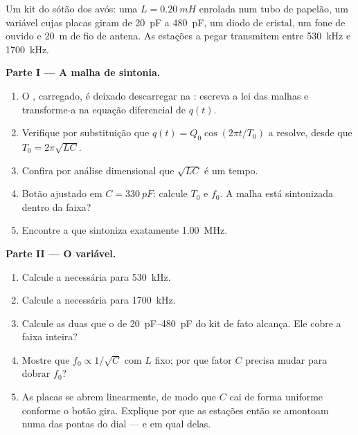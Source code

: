 \begin{problem}
\label{pb:g12:rlc-oscillations:1}
Um kit do sótão dos avós: uma  $L = \qty{0.20}{mH}$ enrolada num tubo de papelão,
um  variável cujas placas giram de \qty{20}{pF} a \qty{480}{pF}, um diodo de
cristal, um fone de ouvido e \qty{20}{m} de fio de antena. As estações a pegar
transmitem entre \qty{530}{kHz} e \qty{1700}{kHz}.

\medskip
\noindent\textbf{Parte I --- A malha de sintonia.}
\begin{enumerate}
  \item O , carregado, é deixado descarregar na : escreva a lei das
        malhas e transforme-a na equação diferencial de $q(t)$.
  \item Verifique por substituição que $q(t) = Q_0\cos(2\pi t/T_0)$ a resolve, desde
        que $T_0 = 2\pi\sqrt{LC}$.
  \item Confira por análise dimensional que $\sqrt{LC}$ é um tempo.
  \item Botão ajustado em $C = \qty{330}{pF}$: calcule $T_0$ e $f_0$. A malha está
        sintonizada dentro da faixa?
  \item Encontre a  que sintoniza exatamente \qty{1.00}{MHz}.
\end{enumerate}

\medskip
\noindent\textbf{Parte II --- O  variável.}
\begin{enumerate}[resume]
  \item Calcule a  necessária para \qty{530}{kHz}.
  \item Calcule a  necessária para \qty{1700}{kHz}.
  \item Calcule as duas  que o  de \qtyrange{20}{480}{pF} do kit
        de fato alcança. Ele cobre a faixa inteira?
  \item Mostre que $f_0 \propto 1/\sqrt{C}$ com $L$ fixo; por que fator $C$ precisa
        mudar para dobrar $f_0$?
  \item As placas se abrem linearmente, de modo que $C$ cai de forma uniforme conforme
        o botão gira. Explique por que as estações então se amontoam numa das pontas do
        dial --- e em qual delas.
\end{enumerate}


\end{problem}
